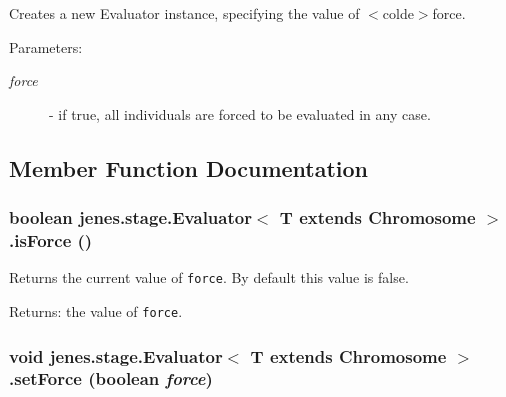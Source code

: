 Creates a new Evaluator instance, specifying the value of $<$colde$>$force.

\begin{Desc}
\item[Parameters:]
\begin{description}
\item[{\em force}]- if true, all individuals are forced to be evaluated in any case. \end{description}
\end{Desc}


\subsection{Member Function Documentation}
\hypertarget{classjenes_1_1stage_1_1_evaluator_3_01_t_01extends_01_chromosome_01_4_617f44ce8de8d0e4bab8506e81038e76}{
\subsubsection[isForce]{\setlength{\rightskip}{0pt plus 5cm}boolean jenes.stage.Evaluator$<$ T extends Chromosome $>$.isForce ()}}
\label{classjenes_1_1stage_1_1_evaluator_3_01_t_01extends_01_chromosome_01_4_617f44ce8de8d0e4bab8506e81038e76}


Returns the current value of {\tt force}. By default this value is false. \begin{Desc}
\item[Returns:]the value of {\tt force}. \end{Desc}
\hypertarget{classjenes_1_1stage_1_1_evaluator_3_01_t_01extends_01_chromosome_01_4_cd9d554678a83708eeb2d373def60e71}{
\subsubsection[setForce]{\setlength{\rightskip}{0pt plus 5cm}void jenes.stage.Evaluator$<$ T extends Chromosome $>$.setForce (boolean {\em force})}}
\label{classjenes_1_1stage_1_1_evaluator_3_01_t_01extends_01_chromosome_01_4_cd9d554678a83708eeb2d373def60e71}


